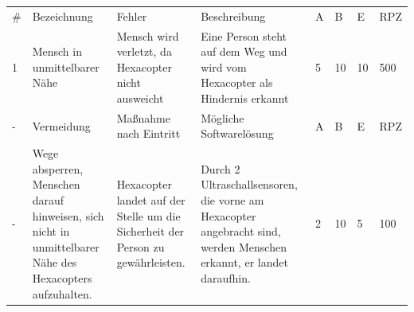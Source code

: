 \begin{longtable}{|p{0.4cm}|p{3.0cm}|p{3.1cm}|p{3.1cm}|p{0.4cm}|p{0.4cm}|p{0.4cm}|p{0.8cm}|}

\hline \#   & Bezeichnung                                                                                               & Fehler                                                                                                                & Beschreibung                                                                                                                    & A   & B   & E   & RPZ \\
 1          & Mensch in unmittelbarer Nähe                                                                              & Mensch wird verletzt, da Hexacopter nicht ausweicht                                                                   & Eine Person steht auf dem Weg und wird vom Hexacopter als Hindernis erkannt                                                     & 5   & 10  & 10  & 500 \\
\hline -    & Vermeidung                                                                                                & Maßnahme nach Eintritt                                                                                                & Mögliche Softwarelösung                                                                                                         & A   & B   & E   & RPZ \\
 -          & Wege absperren, Menschen darauf hinweisen, sich nicht in unmittelbarer Nähe des Hexacopters aufzuhalten.  & Hexacopter landet auf der Stelle um die Sicherheit der Person zu gewährleisten.                                       & Durch 2 Ultraschallsensoren, die vorne am Hexacopter angebracht sind, werden Menschen erkannt, er landet daraufhin.             & 2   & 10  & 5   & 100 \\\hline


\end{longtable}
